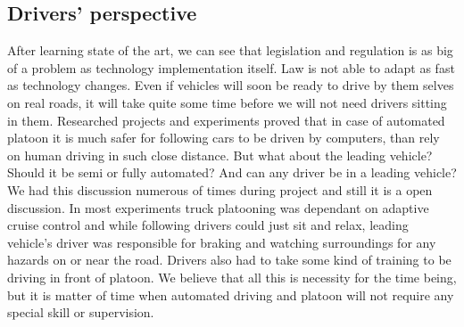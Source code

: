 \subsection{Drivers' perspective}
After learning state of the art, we can see that legislation and regulation is as big of a problem as technology implementation itself. Law is not able to adapt as fast as technology changes. Even if vehicles will soon be ready to drive by them selves on real roads, it will take quite some time before we will not need drivers sitting in them. Researched projects and experiments proved that in case of automated platoon it is much safer for following cars to be driven by computers, than rely on human driving in such close distance. But what about the leading vehicle? Should it be semi or fully automated? And can any driver be in a leading vehicle? We had this discussion numerous of times during project and still it is a open discussion. In most experiments truck platooning was dependant on adaptive cruise control and while following drivers could just sit and relax, leading vehicle's driver was responsible for braking and watching surroundings for any hazards on or near the road. Drivers also had to take some kind of training to be driving in front of platoon. We believe that all this is necessity for the time being, but it is matter of time when automated driving and platoon will not require any special skill or supervision.
%